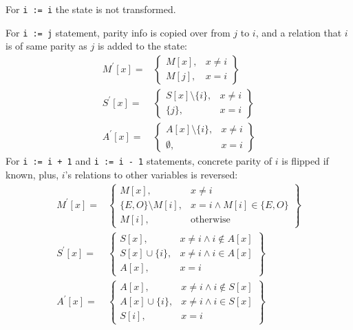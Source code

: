 For \texttt{i := i} the state is not transformed.

For \texttt{i := j} statement, parity info is copied over from $j$ to $i$, and a relation that $i$ is of same parity as $j$ is added to the state:
\begin{align*}
M^\prime[x] = & \left.
	\begin{cases}
		M[x], & x\ne i \\
		M[j], & x = i
	\end{cases}
\right\}\\
S^\prime[x] = & \left.
	\begin{cases}
		S[x] \setminus \{i\}, & x\ne i \\
		\{j\}, & x = i
	\end{cases}
\right\}\\
A^\prime[x] = & \left.
\begin{cases}
	A[x] \setminus \{i\}, & x\ne i \\
	\emptyset, & x = i
\end{cases}
\right\}
\end{align*}
For \texttt{i := i + 1} and \texttt{i := i - 1} statements, concrete parity of $i$ is flipped if known, plus, $i$'s relations to other variables is reversed:
\begin{align*}
M^\prime[x] = & \left.
	\begin{cases}
		M[x], & x\ne i \\
		\{E, O\} \setminus M[i], & x = i \wedge M[i] \in \{E, O\} \\
		M[i], & \text{otherwise}
	\end{cases}
\right\}\\
S^\prime[x] = & \left.
	\begin{cases}
		S[x], & x\ne i \wedge i \notin A[x]\\
		S[x] \cup \{i\}, & x\ne i \wedge i \in A[x]\\
		A[x], & x = i
	\end{cases}
\right\}\\
A^\prime[x] = & \left.
	\begin{cases}
		A[x], & x\ne i \wedge i \notin S[x]\\
		A[x] \cup \{i\}, & x\ne i \wedge i \in S[x]\\
		S[i], & x = i
	\end{cases}
\right\}
\end{align*}


